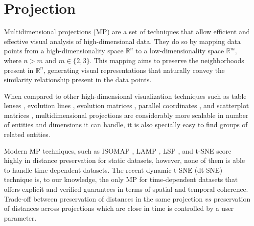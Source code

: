 \chapter{Projection} \label{sec:proj}
Multidimensional projections (MP) are a set of techniques that allow efficient and effective visual analysis of high-dimensional data. They do so by mapping data points from a high-dimensionality space ${\mathbb{R}^{n}}$ to a low-dimensionality space $\mathbb{R}^{m}$, where ${n > m}$ and ${m \in \{2,3\}}$. This mapping aims to preserve the neighborhoods present in  ${\mathbb{R}^{n}}$, generating visual representations that naturally convey the similarity relationship present in the data points.

When compared to other high-dimensional visualization techniques such as table lenses \cite{ref:solid}, evolution lines \cite{ref:evolines}, evolution matrices \cite{ref:evomat}, parallel coordinates \cite{ref:parallelcoords}, and scatterplot matrices \cite{ref:scatter}, multidimensional projections are considerably more scalable in number of entities and dimensions it can handle, it is also specially easy to find groups of related entities.

Modern MP techniques, such as ISOMAP \cite{ref:tenenbaum2000ISOMAP}, LAMP \cite{joia2011LAMP}, LSP \cite{paulovich2008LSP}, and t-SNE \cite{maaten2008tsne} score highly in distance preservation for static datasets, however, none of them is able to handle time-dependent datasets. The recent dynamic t-SNE (dt-SNE) \cite{ref:dtsne} technique is, to our knowledge, the only MP for time-dependent datasets that offers explicit and verified guarantees in terms of spatial and temporal coherence. Trade-off between preservation of distances in the same projection $vs$ preservation of distances across projections which are close in time is controlled by a user parameter.


